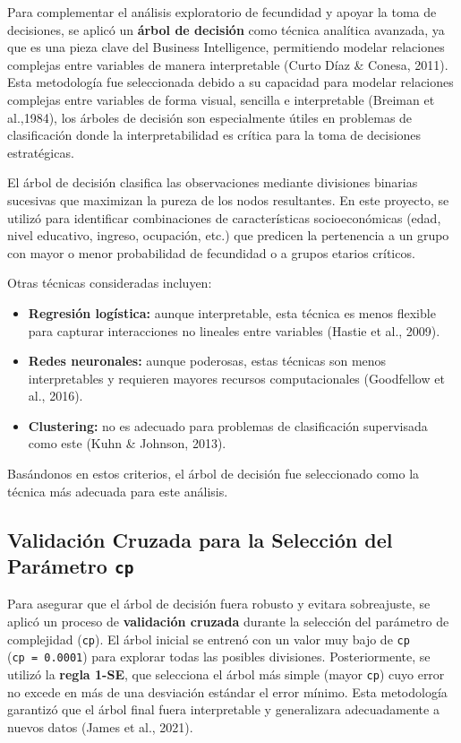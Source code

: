 \documentclass[
]{article}
\providecommand{\tightlist}{%
  \setlength{\itemsep}{0pt}\setlength{\parskip}{0pt}}
\begin{document}
Para complementar el análisis exploratorio de fecundidad y apoyar la
toma de decisiones, se aplicó un \textbf{árbol de decisión} como técnica
analítica avanzada, ya que es una pieza clave del Business Intelligence,
permitiendo modelar relaciones complejas entre variables de manera
interpretable (Curto Díaz \& Conesa, 2011). Esta metodología fue
seleccionada debido a su capacidad para modelar relaciones complejas
entre variables de forma visual, sencilla e interpretable (Breiman et
al.,1984), los árboles de decisión son especialmente útiles en problemas
de clasificación donde la interpretabilidad es crítica para la toma de
decisiones estratégicas.

El árbol de decisión clasifica las observaciones mediante divisiones
binarias sucesivas que maximizan la pureza de los nodos resultantes. En
este proyecto, se utilizó para identificar combinaciones de
características socioeconómicas (edad, nivel educativo, ingreso,
ocupación, etc.) que predicen la pertenencia a un grupo con mayor o
menor probabilidad de fecundidad o a grupos etarios críticos.

Otras técnicas consideradas incluyen:

\begin{itemize}
\tightlist
\item
  \textbf{Regresión logística:} aunque interpretable, esta técnica es
  menos flexible para capturar interacciones no lineales entre variables
  (Hastie et al., 2009).
\item
  \textbf{Redes neuronales:} aunque poderosas, estas técnicas son menos
  interpretables y requieren mayores recursos computacionales
  (Goodfellow et al., 2016).
\item
  \textbf{Clustering:} no es adecuado para problemas de clasificación
  supervisada como este (Kuhn \& Johnson, 2013).
\end{itemize}

Basándonos en estos criterios, el árbol de decisión fue seleccionado
como la técnica más adecuada para este análisis.

\subsection{\texorpdfstring{Validación Cruzada para la Selección del
Parámetro
\texttt{cp}}{Validación Cruzada para la Selección del Parámetro cp}}\label{validaciuxf3n-cruzada-para-la-selecciuxf3n-del-paruxe1metro-cp}

Para asegurar que el árbol de decisión fuera robusto y evitara
sobreajuste, se aplicó un proceso de \textbf{validación cruzada} durante
la selección del parámetro de complejidad (\texttt{cp}). El árbol
inicial se entrenó con un valor muy bajo de \texttt{cp}
(\texttt{cp\ =\ 0.0001}) para explorar todas las posibles divisiones.
Posteriormente, se utilizó la \textbf{regla 1-SE}, que selecciona el
árbol más simple (mayor \texttt{cp}) cuyo error no excede en más de una
desviación estándar el error mínimo. Esta metodología garantizó que el
árbol final fuera interpretable y generalizara adecuadamente a nuevos
datos (James et al., 2021).
\end{document}
